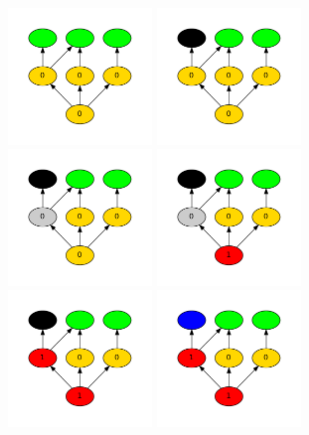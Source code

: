 \documentclass[12pt]{article}
\begin{document}
\begin{figure}
\hspace{-0.5in}
\includegraphics[width=1.5in]{tutorial_1/dot11.pdf}
\includegraphics[width=1.5in]{tutorial_1/dot12.pdf}
\includegraphics[width=1.5in]{tutorial_1/dot13.pdf}
\includegraphics[width=1.5in]{tutorial_1/dot14.pdf}
\includegraphics[width=1.5in]{tutorial_1/dot15.pdf}
\includegraphics[width=1.5in]{tutorial_1/dot16.pdf}

\end{figure}
\end{document}
